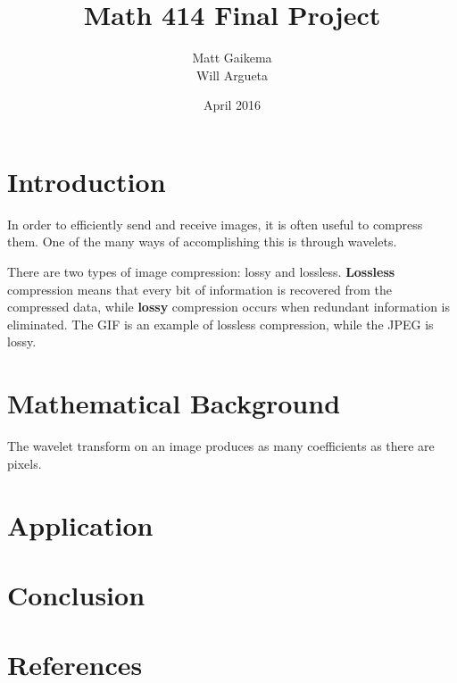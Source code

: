 \documentclass{article}
\title{Math 414 Final Project}
\author{Matt Gaikema \\ Will Argueta}
\date{April 2016}
\begin{document}
\maketitle

\section{Introduction}

In order to efficiently send and receive images, it is often useful to compress them.
One of the many ways of accomplishing this is through wavelets.

There are two types of image compression: lossy and lossless.
\textbf{Lossless} compression means that every bit of information is recovered from the compressed data,
while \textbf{lossy} compression occurs when redundant information is eliminated.
The GIF is an example of lossless compression, while the JPEG is lossy.


\section{Mathematical Background}

The wavelet transform on an image produces as many coefficients as there are pixels.


\section{Application}


\section{Conclusion}


\section{References}
\end{document}

